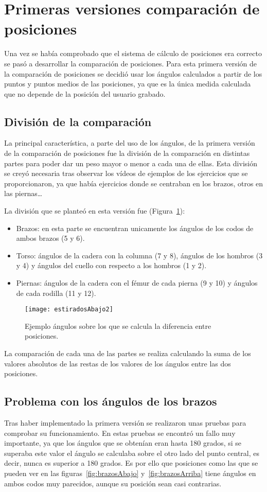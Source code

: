{\section{Primeras versiones comparación de posiciones} \label{PrimeraVersion}
Una vez se había comprobado que el sistema de cálculo de posiciones era correcto se pasó a desarrollar la comparación de posiciones. Para esta primera versión de la comparación de posiciones se decidió usar los ángulos calculados a partir de los puntos y puntos medios de las posiciones, ya que es la única medida calculada que no depende de la posición del usuario grabado.
\subsection{División de la comparación}
La principal característica, a parte del uso de los ángulos, de la primera versión de la comparación de posiciones fue la división de la comparación en distintas partes para poder dar un peso mayor o menor a cada una de ellas. Esta división se creyó necesaria tras observar los vídeos de ejemplos de los ejercicios que se proporcionaron, ya que había ejercicios donde se centraban en los brazos, otros en las piernas\ldots

La división que se planteó en esta versión fue (Figura~\ref{fig:estiradosAbajo2}):
\begin{itemize}
	\item Brazos: en esta parte se encuentran unicamente los ángulos de los codos de ambos brazos (5 y 6).
	\item Torso: ángulos de la cadera con la columna (7 y 8), ángulos de los hombros (3 y 4) y ángulos del cuello con respecto a los hombros (1 y 2).
	\item Piernas: ángulos de la cadera con el fémur de cada pierna (9 y 10) y ángulos de cada rodilla (11 y 12).
\end{itemize}

\begin{figure}[h]
	\centering
	\texttt{[image: estiradosAbajo2]}
	\caption{Ejemplo ángulos sobre los que se calcula la diferencia entre posiciones.}
	\label{fig:estiradosAbajo2}
\end{figure}

La comparación de cada una de las partes se realiza calculando la suma de los valores absolutos de las restas de los valores de los ángulos entre las dos posiciones.

\subsection{Problema con los ángulos de los brazos}
Tras haber implementado la primera versión se realizaron unas pruebas para comprobar su funcionamiento. En estas pruebas se encontró un fallo muy importante, ya que los ángulos que se obtenían eran hasta 180 grados, si se superaba este valor el ángulo se calculaba sobre el otro lado del punto central, es decir, nunca es superior a 180 grados. Es por ello que  posiciones como las que se pueden ver en las figuras~\ref{fig:brazosAbajo} y~\ref{fig:brazosArriba} tiene ángulos en ambos codos muy parecidos, aunque su posición sean casi contrarias.

}
